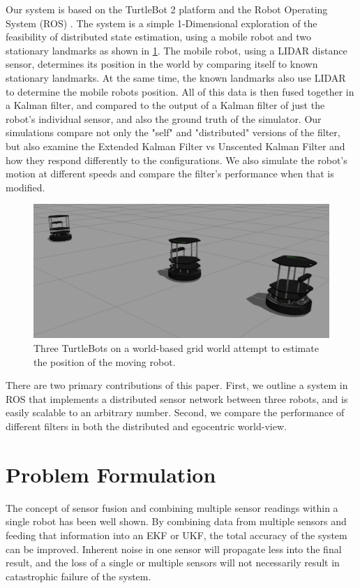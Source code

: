 \documentclass[conference]{IEEEtran} \usepackage[T1]{fontenc} \usepackage[backend=biber, style=ieee]{biblatex}
\begin{document}
Our system is based on the TurtleBot 2 platform and the Robot Operating System (ROS) \cite{ros_original}. The system is a simple 1-Dimensional exploration of the feasibility of distributed state estimation, using a mobile robot and two stationary landmarks as shown in \ref{pic1}. The mobile robot, using a LIDAR distance sensor, determines its position in the world by comparing itself to known stationary landmarks. At the same time, the known landmarks also use LIDAR to determine the mobile robots position. All of this data is then fused together in a Kalman filter, and compared to the output of a Kalman filter of just the robot's individual sensor, and also the ground truth of the simulator. Our simulations compare not only the "self" and "distributed" versions of the filter, but also examine the Extended Kalman Filter vs Unscented Kalman Filter and how they respond differently to the configurations. We also simulate the robot's motion at different speeds and compare the filter's performance when that is modified.

\begin{figure}
\label{pic1} 
\centering 
\includegraphics[scale=.2]{sim1}
\caption{Three TurtleBots on a world-based grid world attempt to estimate the position of the moving robot.}
\end{figure}

There are two primary contributions of this paper. First, we outline a system in ROS that implements a distributed sensor network between three robots, and is easily scalable to an arbitrary number. Second, we compare the performance of different filters in both the distributed and egocentric world-view.

\section{Problem Formulation} \label{Problem Formulation} %
The concept of sensor fusion and combining multiple sensor readings within a single robot has been well shown. By
combining data from multiple sensors and feeding that information into an EKF or UKF, the total accuracy of the system
can be improved. Inherent noise in one sensor will propagate less into the final result, and the loss of a single or
multiple sensors will not necessarily result in catastrophic failure of the system.
\end{document}
